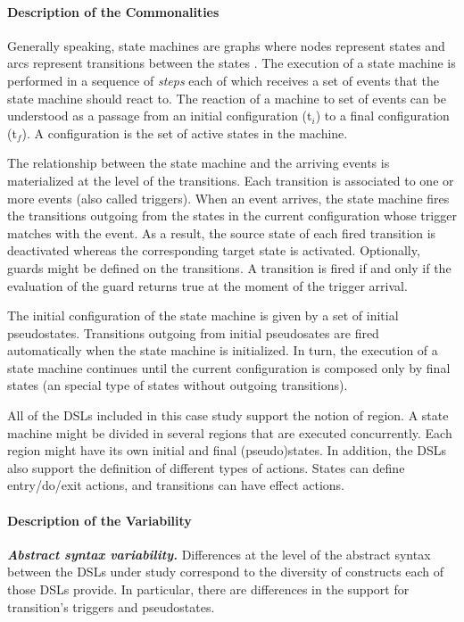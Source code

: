 \paragraph{Description of the Commonalities}

Generally speaking, state machines are graphs where nodes represent states and arcs represent transitions between the states \cite{Harel:1987}. The execution of a state machine is performed in a sequence of \textit{steps} each of which receives a set of events that the state machine should react to. The reaction of a machine to set of events can be understood as a passage from an initial configuration (t$_i$) to a final configuration (t$_{f}$). A configuration is the set of active states in the machine.

The relationship between the state machine and the arriving events is materialized at the level of the transitions. Each transition is associated to one or more events (also called triggers). When an event arrives, the state machine fires the transitions outgoing from the states in the current configuration whose trigger matches with the event. As a result, the source state of each fired transition is deactivated whereas the corresponding target state is activated. Optionally, guards might be defined on the transitions. A transition is fired if and only if the evaluation of the guard returns true at the moment of the trigger arrival.

The initial configuration of the state machine is given by a set of initial pseudostates.  Transitions outgoing from initial pseudosates are fired automatically when the state machine is initialized. In turn, the execution of a state machine continues until the current configuration is composed only by final states (an special type of states without outgoing transitions).

All of the DSLs included in this case study support the notion of region. A state machine might be divided in several regions that are executed concurrently. Each region might have its own initial and final (pseudo)states. In addition, the DSLs also support the definition of different types of actions. States can define entry/do/exit actions, and transitions can have effect actions.

\paragraph{Description of the Variability}

\vspace{2mm}
\textit{\textbf{Abstract syntax variability.}} Differences at the level of the abstract syntax between the DSLs under study correspond to the diversity of constructs each of those DSLs provide. In particular, there are differences in the support for transition's triggers and pseudostates.

